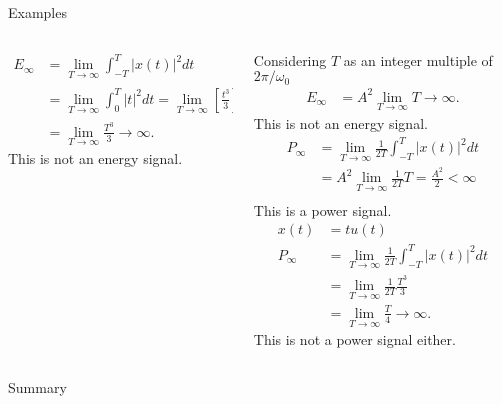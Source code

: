 \begin{frame}{Examples}
\begin{columns}[t]
\begin{column}{0.5\textwidth}
\begin{overprint}
\begin{align*}
                    E_\infty &=  \lim_{T\rightarrow \infty}\int_{-T}^{T}|x(t)|^2dt\\
                    &= \lim_{T\rightarrow \infty}\int_{0}^{T} |t|^2dt
                    = \lim_{T\rightarrow \infty} \left[\frac{t^3}{3}\right]_0^T\\
                    &= \lim_{T\rightarrow \infty}\frac{T^3}{3} \rightarrow \infty.
                \end{align*}
                This is not an energy signal.
            \end{overprint}
        \end{column}
        \begin{column}{0.5\textwidth}
            \begin{overprint}
                Considering $T$ as an integer multiple of $2\pi/\omega_0$
                \begin{align*}
                    E_\infty &= A^2\lim_{T\rightarrow \infty}T \rightarrow \infty.
                \end{align*}
                This is not an energy signal.
                \begin{align*}
                    P_\infty &= \lim_{T\rightarrow \infty} \frac{1}{2T}\int_{-T}^{T}|x(t)|^2dt\\
                    &= A^2\lim_{T\rightarrow \infty}\frac{1}{2T}T  = \frac{A^2}{2} < \infty\\
                \end{align*}
                This is a power signal.
                \begin{align*}
                    x(t) &= tu(t)\\
                    P_\infty &=  \lim_{T\rightarrow \infty}\frac{1}{2T}\int_{-T}^{T}|x(t)|^2dt\\
                    &= \lim_{T\rightarrow \infty}\frac{1}{2T}\frac{T^3}{3}\\
                    &= \lim_{T\rightarrow \infty}\frac{T}{4} \rightarrow \infty.
                \end{align*}
                This is not a power signal either.
            \end{overprint}
        \end{column}
    \end{columns}
\end{frame} 


\begin{frame}{Summary}
\end{frame}
